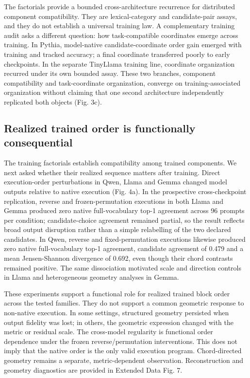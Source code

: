 \documentclass[12pt]{article}
\begin{document}
The factorials provide a bounded cross-architecture recurrence for distributed component compatibility. They are lexical-category and candidate-pair assays, and they do not establish a universal training law. A complementary training audit asks a different question: how task-compatible coordinates emerge across training. In Pythia, model-native candidate-coordinate order gain emerged with training and tracked accuracy; a final coordinate transferred poorly to early checkpoints. In the separate TinyLlama training line, coordinate organization recurred under its own bounded assay. These two branches, component compatibility and task-coordinate organization, converge on training-associated organization without claiming that one second architecture independently replicated both objects (Fig. 3c).

\subsection*{Realized trained order is functionally consequential}

The training factorials establish compatibility among trained components. We next asked whether their realized sequence matters after training. Direct execution-order perturbations in Qwen, Llama and Gemma changed model outputs relative to native execution (Fig. 4a). In the prospective cross-checkpoint replication, reverse and frozen-permutation executions in both Llama and Gemma produced zero native full-vocabulary top-1 agreement across 96 prompts per condition; candidate-choice agreement remained partial, so the result reflects broad output disruption rather than a simple relabelling of the two declared candidates. In Qwen, reverse and fixed-permutation executions likewise produced zero native full-vocabulary top-1 agreement, candidate agreement of 0.479 and a mean Jensen-Shannon divergence of 0.692, even though their chord contrasts remained positive. The same dissociation motivated scale and direction controls in Llama and heterogeneous geometry analyses in Gemma.

These experiments support a functional role for realized trained block order across the tested families. They do not support a common geometric response to non-native execution. In some settings, structured geometry persisted when output fidelity was lost; in others, the geometric expression changed with the metric or residual scale. The cross-model regularity is functional order dependence under the frozen reverse/permutation interventions. This does not imply that the native order is the only valid execution program. Chord-directed geometry remains a separate, metric-dependent observation. Reconstruction and geometry diagnostics are provided in Extended Data Fig. 7.
\end{document}
